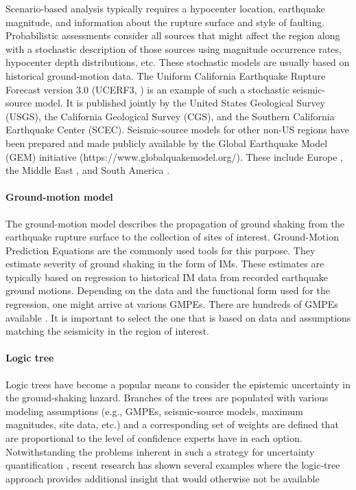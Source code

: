 Scenario-based analysis typically requires a hypocenter location, earthquake magnitude, and information about the rupture surface and style of faulting. Probabilistic assessments consider all sources that might affect the region along with a stochastic description of those sources using magnitude occurrence rates, hypocenter depth distributions, etc. These stochastic models are usually based on historical ground-motion data. The Uniform California Earthquake Rupture Forecast version 3.0 (UCERF3, \cite{field2014uniform}) is an example of such a stochastic seismic-source model. It is published jointly by the United States Geological Survey (USGS), the California Geological Survey (CGS), and the Southern California Earthquake Center (SCEC). Seismic-source models for other non-US regions have been prepared and made publicly available by the Global Earthquake Model (GEM) initiative (https://www.globalquakemodel.org/). These include Europe \citep{giardini2014mapping}, the Middle East \citep{danciu20172014}, and South America \citep{garcia2018creation}.

\paragraph{Ground-motion model} The ground-motion model describes the propagation of ground shaking from the earthquake rupture surface to the collection of sites of interest. Ground-Motion Prediction Equations are the commonly used tools for this purpose. They estimate severity of ground shaking in the form of IMs. These estimates are typically based on regression to historical IM data from recorded earthquake ground motions. Depending on the data and the functional form used for the regression, one might arrive at various GMPEs. There are hundreds of GMPEs available \citep{douglas2018ground}. It is important to select the one that is based on data and assumptions matching the seismicity in the region of interest.

\paragraph{Logic tree} Logic trees have become a popular means to consider the epistemic uncertainty in the ground-shaking hazard. Branches of the trees are populated with various modeling assumptions (e.g., GMPEs, seismic-source models, maximum magnitudes, site data, etc.) and a corresponding set of weights are defined that are proportional to the level of confidence experts have in each option. Notwithstanding the problems inherent in such a strategy for uncertainty quantification \citep{bommer2008use}, recent research has shown several examples where the logic-tree approach provides additional insight that would otherwise not be available \citep[see e.g.][]{goulet2017ngaeast}

